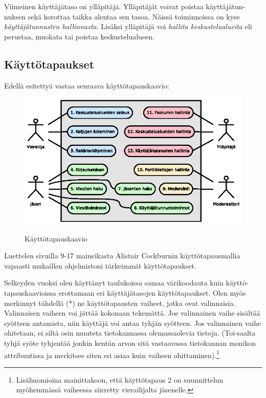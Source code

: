 \documentclass[11pt]{article}
\begin{document}
		Viimeinen käyttäjätaso on ylläpitäjä. Ylläpitäjät voivat poistaa käyttäjätun-nuksen sekä korottaa taikka
		alentaa sen tasoa. Näissä toiminnoissa on kyse \emph{käyttäjätunnusten hallinnasta}. Lisäksi ylläpitäjä
		voi \emph{hallita keskustelualueita} eli perustaa, muokata tai poistaa keskustelualueen.
	
	\subsection{Käyttötapaukset}
		Edellä esitettyä vastaa seuraava käyttötapauskaavio:
		\begin{figure}[H]
			\centering
			\includegraphics[trim = 7mm 0mm 0mm 0mm,scale=1.5]{kayttotapauskaavio.eps}\\
			\caption{Käyttötapauskaavio}
		\end{figure}
	
		Luettelen sivuilla 9-17 maineikasta Alistair Cockburnin käyttötapausmallia \cite{c}
		vapaasti mukaillen ohjelmistoni tärkeimmät käyttötapaukset.
	
		\newpage
		\thispagestyle{plain}
		\noindent
		Selkeyden vuoksi olen käyttänyt taulukoissa samaa värikoodauta kuin käyttö-tapauskaavioissa erottamaan
		eri käyttäjätasojen käyttötapaukset. Olen myös merkinnyt tähdellä (*) ne käyttötapausten vaiheet,
		jotka ovat valinnaisia. Valinnaisen vaiheen voi jättää kokonaan tekemättä. Jos valinnainen vaihe
		sisältää syötteen antamista, niin käyttäjä voi antaa tyhjän syötteen. Jos valinnainen vaihe ohitetaan,
		ei siltä osin muuteta tietokannassa olemassaolevia tietoja. (Toi-saalta tyhjä syöte tyhjentää jonkin
		kentän arvon sitä vastaavassa tietokannan monikon attribuutissa ja merkitsee siten eri asiaa kuin
		vaiheen ohittaminen).\footnote{Lisähuomioina mainittakoon, että käyttötapaus 2 on suunnittelun
		myöhemmässä vaiheessa siirretty vierailijalta jäsenelle.}
	
\end{document}
